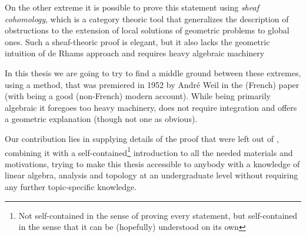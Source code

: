 On the other extreme it is possible to prove this statement using \textit{sheaf cohomology}, which is a category theoric tool
that generalizes the description of obstructions to the extension of local solutions of geometric problems to global ones.
Such a sheaf-theoric proof is elegant, but it also lacks the geometric intuition of de Rhams approach and requires heavy
algebraic machinery

In this thesis we are going to try to find a middle ground between these extremes, using a method, that was premiered in 1952
by André Weil in the (French) paper \cite{weil_sur_1952}
(with \cite{tu_differential_1982} being a good (non-French) modern account). While being primarily algebraic it foregoes too
heavy machinery, does not require integration and offers a geometric explanation (though not one as obvious).

Our contribution lies in supplying details of the proof that were left out of \cite{tu_differential_1982}, combining
it with a self-contained\footnote{
	Not self-contained in the sense of proving every statement, but self-contained in the sense that it can be
	(hopefully) understood on its own
}
introduction to all the needed materials and motivations, trying to make this thesis accessible to anybody with a
knowledge of linear algebra, analysis and topology at an undergraduate level without requiring any further topic-specific
knowledge.
 

